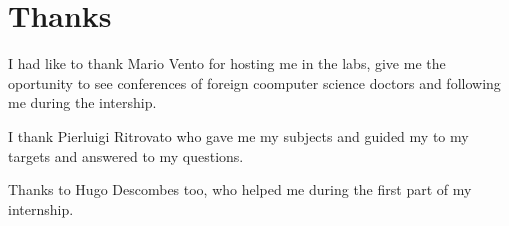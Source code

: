\chapter*{Thanks}
\par I had like to thank Mario Vento for hosting me in the labs, give me the oportunity to see conferences of foreign coomputer science doctors and following me during the intership.	
\par I thank Pierluigi Ritrovato who gave me my subjects and guided my to my targets and answered to my questions.
\par Thanks to Hugo Descombes too, who helped me during the first part of my internship. 